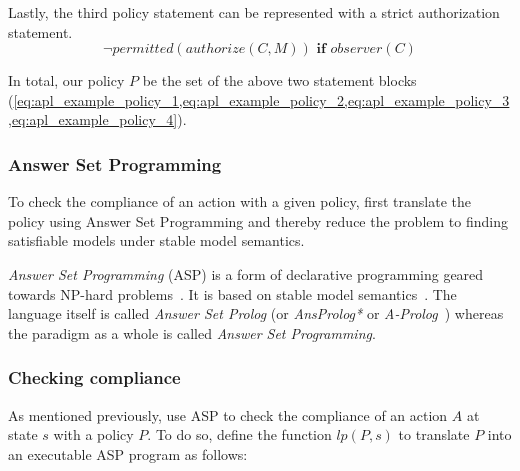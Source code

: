 Lastly, the third policy statement can be represented with a strict authorization statement.
\begin{equation}
    \label{eq:apl_example_policy_4}
    \neg permitted(authorize(C, M)) \textbf{ if } observer(C)
\end{equation}

In total, our policy $P$ be the set of the above two statement blocks (\cref{eq:apl_example_policy_1,eq:apl_example_policy_2,eq:apl_example_policy_3,eq:apl_example_policy_4}).

\subsubsection{Answer Set Programming}
\label{subsubsec:asp}

To check the compliance of an action with a given policy, \citet{gelfond_authorization_2008} first translate the policy using Answer Set Programming and thereby reduce the problem to finding satisfiable models under stable model semantics.

\textit{Answer Set Programming} (ASP) is a form of declarative programming geared towards NP-hard problems~\citep{vladimir_lifschitz_what_2008}.
It is based on stable model semantics~\citep{gelfond_stable_1988}.
The language itself is called \textit{Answer Set Prolog} (or \textit{AnsProlog*} or \textit{A-Prolog}~\citep{baral_answer_2004}) whereas the paradigm as a whole is called \textit{Answer Set Programming}.

\subsubsection{Checking compliance}

As mentioned previously, \citet{gelfond_authorization_2008} use ASP to check the compliance of an action $A$ at state $s$ with a policy $P$.
To do so, \citet{gelfond_authorization_2008} define the function $lp(P,s)$ to translate $P$ into an executable ASP program as follows:

